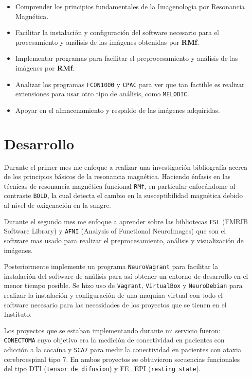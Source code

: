 \documentclass{article}
\begin{document}
\begin{itemize}
\item Comprender los principios fundamentales de la Imagenología por Resonancia Magnética.

\item Facilitar la instalación y configuración del software necesario para el procesamiento y análisis de las imágenes obtenidas por \textbf{RMf}.

\item Implementar programas para facilitar el preprocesamiento y análisis de las imágenes por \textbf{RMf}.

\item Analizar los programas \texttt{FCON1000} y \texttt{CPAC} para ver que tan factible es realizar extensiones para usar otro tipo de análisis, como \texttt{MELODIC}.

\item Apoyar en el almacenamiento y respaldo de las imágenes adquiridas.
\end{itemize}

\section{Desarrollo}
Durante el primer mes me enfoque a realizar una investigación bibliografía acerca de los principios básicos de la resonancia magnética. Haciendo énfasis en las técnicas de resonancia magnética funcional \texttt{RMf}, en particular enfocándome al contraste \texttt{BOLD}, la cual detecta el cambio en la susceptibilidad magnética debido al nivel de oxigenación en la sangre.

Durante el segundo mes me enfoque a aprender sobre las bibliotecas \texttt{FSL} (FMRIB Software Library) y \texttt{AFNI} (Analysis of Functional NeuroImages) que son el software mas usado para realizar el preprocesamiento, análisis y visualización de imágenes.

Posteriormente implemente un programa \texttt{NeuroVagrant} para facilitar la instalación del software de análisis para así obtener un entorno de desarrollo en el menor tiempo posible. Se hizo uso de \texttt{Vagrant}, \texttt{VirtualBox} y \texttt{NeuroDebian} para realizar la instalación y configuración de una maquina virtual con todo el software necesario para las necesidades de los proyectos que se tienen en el Instituto.

Los proyectos que se estaban implementando durante mi servicio fueron: \texttt{CONECTOMA} cuyo objetivo era la medición de conectividad en pacientes con adicción a la cocaína y \texttt{SCA7} para medir la conectividad en pacientes con ataxia cerebroespinal tipo 7. En ambos proyectos se obtuvieron secuencias funcionales del tipo DTI (\texttt{tensor de difusion}) y FE\_EPI (\texttt{resting state}).
\end{document}
